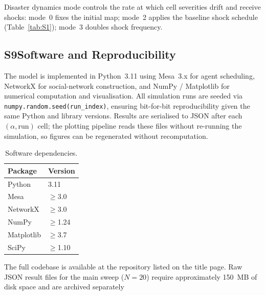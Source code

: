 \documentclass[pdflatex,sn-apa]{sn-jnl}%
\begin{document}
\begin{appendices}
Disaster dynamics mode controls the rate at which cell severities drift and
receive shocks: mode~0 fixes the initial map; mode~2 applies the baseline shock
schedule (Table~\ref{tab:S1}); mode~3 doubles shock frequency.

\subsection*{S9\quad Software and Reproducibility}

The model is implemented in Python~3.11 using Mesa~3.x for agent scheduling,
NetworkX for social-network construction, and NumPy / Matplotlib for numerical
computation and visualisation.
All simulation runs are seeded via \texttt{numpy.random.seed(run\_index)},
ensuring bit-for-bit reproducibility given the same Python and library versions.
Results are serialised to JSON after each $(\alpha,\mathrm{run})$ cell; the
plotting pipeline reads these files without re-running the simulation, so figures
can be regenerated without recomputation.

\begin{table}[h]
\centering
\caption{Software dependencies.}
\label{tab:S9}
\begin{tabular}{ll}
\toprule
Package & Version \\
\midrule
Python     & 3.11 \\
Mesa       & $\geq$3.0 \\
NetworkX   & $\geq$3.0 \\
NumPy      & $\geq$1.24 \\
Matplotlib & $\geq$3.7 \\
SciPy      & $\geq$1.10 \\
\bottomrule
\end{tabular}
\end{table}

The full codebase is available at the repository listed on the title page.
Raw JSON result files for the main sweep ($N=20$) require approximately 150~MB
of disk space and are archived separately

\end{appendices}

\end{document}
